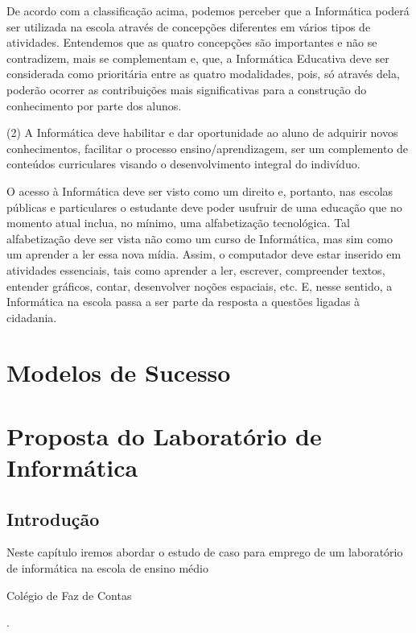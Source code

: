 \documentclass[a4paper,12pt]{report}
\begin{document}
    De acordo com a classificação acima, podemos perceber que a Informática
    poderá ser utilizada na escola através de concepções diferentes em vários
    tipos de atividades. Entendemos que as quatro concepções são importantes e
    não se contradizem, mais se complementam e, que, a Informática Educativa
    deve ser considerada como prioritária entre as quatro modalidades, pois, só
    através dela, poderão ocorrer as contribuições mais significativas para a
    construção do conhecimento por parte dos alunos.

    (2) A Informática deve habilitar e dar oportunidade ao aluno de adquirir
    novos conhecimentos, facilitar o processo ensino/aprendizagem, ser um
    complemento de conteúdos curriculares visando o desenvolvimento integral do
    indivíduo.

    O acesso à Informática deve ser visto como um direito e, portanto, nas
    escolas públicas e particulares o estudante deve poder usufruir de uma
    educação que no momento atual inclua, no mínimo, uma alfabetização
    tecnológica. Tal alfabetização deve ser vista não como um curso de
    Informática, mas sim como um aprender a ler essa nova mídia. Assim, o
    computador deve estar inserido em atividades essenciais, tais como aprender
    a ler, escrever, compreender textos, entender gráficos, contar, desenvolver
    noções espaciais, etc. E, nesse sentido, a Informática na escola passa a ser
    parte da resposta a questões ligadas à cidadania.

    \chapter{Modelos de Sucesso}
    \label{ch:modelo_sucesso}

    \chapter[Laboratório]{Proposta do Laboratório de Informática}
    \label{ch:laboratorio}

        \section{Introdução}
        \label{sc:laboratorio_intro}
        Neste capítulo iremos abordar o estudo de caso para emprego de um
        laboratório de informática na escola de ensino médio
        \begin{bfseries}Colégio de Faz de Contas\end{bfseries}.
\end{document}
